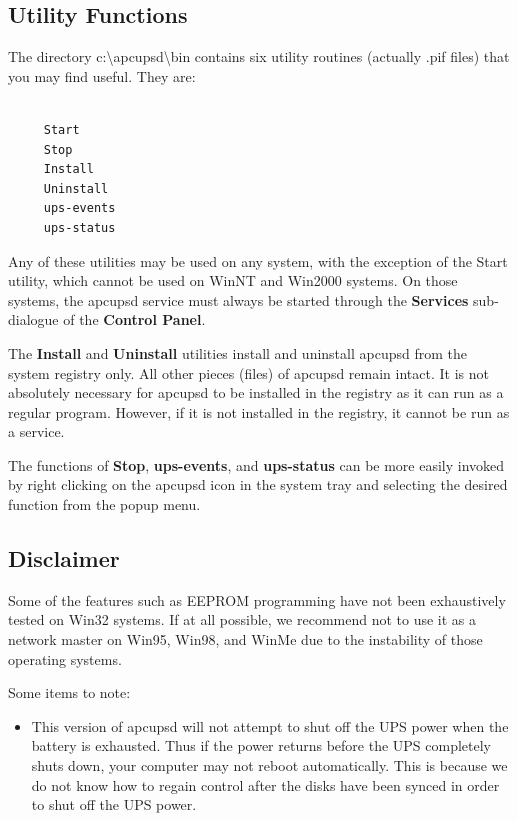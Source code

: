 {{{{{{{{{{\label{Utility-Functions}

\subsection*{Utility Functions}

The directory c:\textbackslash{}apcupsd\textbackslash{}bin contains six
utility routines (actually .pif files) that you may find useful. They are: 

\footnotesize
\begin{verbatim}
     
     Start
     Stop
     Install
     Uninstall
     ups-events
     ups-status
\end{verbatim}
\normalsize

Any of these utilities may be used on any system, with the exception of the
Start utility, which cannot be used on WinNT and Win2000 systems. On those
systems, the apcupsd service must always be started through the {\bf Services}
sub-dialogue of the {\bf Control Panel}.  

The {\bf Install} and {\bf Uninstall} utilities install and uninstall apcupsd
from the system registry only. All other pieces (files) of apcupsd remain
intact. It is not absolutely necessary for apcupsd to be installed in the
registry as it can run as a regular program. However, if it is not installed
in the registry, it cannot be run as a service.  

The functions of {\bf Stop}, {\bf ups-events}, and {\bf ups-status} can be
more easily invoked by right clicking on the apcupsd icon in the system tray
and selecting the desired function from the popup menu. 

\label{Disclaimer}

\subsection*{Disclaimer}

\label{index-Disclaimer-180}
Some of the features such as EEPROM programming have not been exhaustively
tested on Win32 systems. If at all possible, we recommend not to use it as a
network master on Win95, Win98, and WinMe due to the instability of those
operating systems.  

Some items to note:  

\begin{itemize}
\item This version of apcupsd will not attempt to shut off the UPS power when
   the battery is exhausted. Thus if the power returns before the UPS completely
   shuts down, your computer may not reboot automatically. This is because we do
not know how to regain control after the disks have been synced in order to
shut off the UPS power.  


\end{itemize}}}}}}}}}}}
